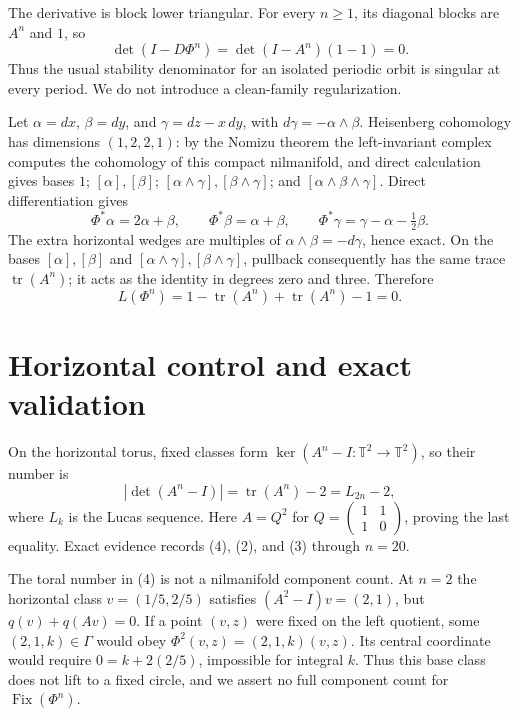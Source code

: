 \documentclass[10pt]{article}
\begin{document}
The derivative is block lower triangular.  For every $n\geq1$, its diagonal
blocks are $A^n$ and $1$, so
\begin{equation}
\det(I-D\Phi^n)=\det(I-A^n)(1-1)=0.              \tag{2}
\end{equation}
Thus the usual stability denominator for an isolated periodic orbit is
singular at every period.  We do not introduce a clean-family regularization.

Let $\alpha=dx$, $\beta=dy$, and $\gamma=dz-x\,dy$, with
$d\gamma=-\alpha\wedge\beta$.  Heisenberg cohomology has dimensions
$(1,2,2,1)$: by the Nomizu theorem the left-invariant complex computes the
cohomology of this compact nilmanifold, and direct calculation gives bases
$1$; $[\alpha],[\beta]$;
$[\alpha\wedge\gamma],[\beta\wedge\gamma]$; and
$[\alpha\wedge\beta\wedge\gamma]$.  Direct differentiation gives
\[
\Phi^*\alpha=2\alpha+\beta,\qquad
\Phi^*\beta=\alpha+\beta,\qquad
\Phi^*\gamma=\gamma-\alpha-\tfrac12\beta.
\]
The extra horizontal wedges are multiples of
$\alpha\wedge\beta=-d\gamma$, hence exact.  On the bases
$[\alpha],[\beta]$ and
$[\alpha\wedge\gamma],[\beta\wedge\gamma]$, pullback consequently has the
same trace $\operatorname{tr}(A^n)$; it acts as the identity in degrees zero
and three.  Therefore
\begin{equation}
L(\Phi^n)=1-\operatorname{tr}(A^n)+
\operatorname{tr}(A^n)-1=0.                    \tag{3}
\end{equation}

\section{Horizontal control and exact validation}
On the horizontal torus, fixed classes form
$\ker(A^n-I:\mathbb T^2\to\mathbb T^2)$, so their number is
\begin{equation}
|\det(A^n-I)|=\operatorname{tr}(A^n)-2=L_{2n}-2, \tag{4}
\end{equation}
where $L_k$ is the Lucas sequence.  Here $A=Q^2$ for
$Q=\left(\begin{smallmatrix}1&1\\1&0\end{smallmatrix}\right)$, proving the
last equality.  Exact evidence records (4), (2), and (3) through $n=20$.

The toral number in (4) is not a nilmanifold component count.  At $n=2$ the
horizontal class $v=(1/5,2/5)$ satisfies $(A^2-I)v=(2,1)$, but
$q(v)+q(Av)=0$.  If a point $(v,z)$ were fixed on the left quotient, some
$(2,1,k)\in\Gamma$ would obey $\Phi^2(v,z)=(2,1,k)(v,z)$.  Its central
coordinate would require $0=k+2(2/5)$, impossible for integral $k$.  Thus this
base class does not lift to a fixed circle, and we assert no full component
count for $\operatorname{Fix}(\Phi^n)$.
\end{document}

